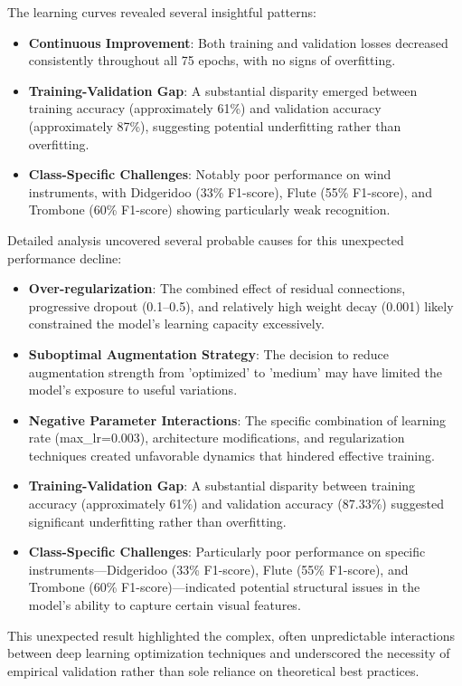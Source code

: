 The learning curves revealed several insightful patterns:
\begin{itemize}
    \item \textbf{Continuous Improvement}: Both training and validation losses decreased consistently throughout all 75 epochs, with no signs of overfitting.
    \item \textbf{Training-Validation Gap}: A substantial disparity emerged between training accuracy (approximately 61\%) and validation accuracy (approximately 87\%), suggesting potential underfitting rather than overfitting.
    \item \textbf{Class-Specific Challenges}: Notably poor performance on wind instruments, with Didgeridoo (33\% F1-score), Flute (55\% F1-score), and Trombone (60\% F1-score) showing particularly weak recognition.
\end{itemize}

Detailed analysis uncovered several probable causes for this unexpected performance decline:
\begin{itemize}
    \item \textbf{Over-regularization}: The combined effect of residual connections, progressive dropout (0.1–0.5), and relatively high weight decay (0.001) likely constrained the model's learning capacity excessively.
    \item \textbf{Suboptimal Augmentation Strategy}: The decision to reduce augmentation strength from 'optimized' to 'medium' may have limited the model's exposure to useful variations.
    \item \textbf{Negative Parameter Interactions}: The specific combination of learning rate (max\_lr=0.003), architecture modifications, and regularization techniques created unfavorable dynamics that hindered effective training.
    \item \textbf{Training-Validation Gap}: A substantial disparity between training accuracy (approximately 61\%) and validation accuracy (87.33\%) suggested significant underfitting rather than overfitting.
    \item \textbf{Class-Specific Challenges}: Particularly poor performance on specific instruments—Didgeridoo (33\% F1-score), Flute (55\% F1-score), and Trombone (60\% F1-score)—indicated potential structural issues in the model's ability to capture certain visual features.
\end{itemize}

This unexpected result highlighted the complex, often unpredictable interactions between deep learning optimization techniques and underscored the necessity of empirical validation rather than sole reliance on theoretical best practices.

